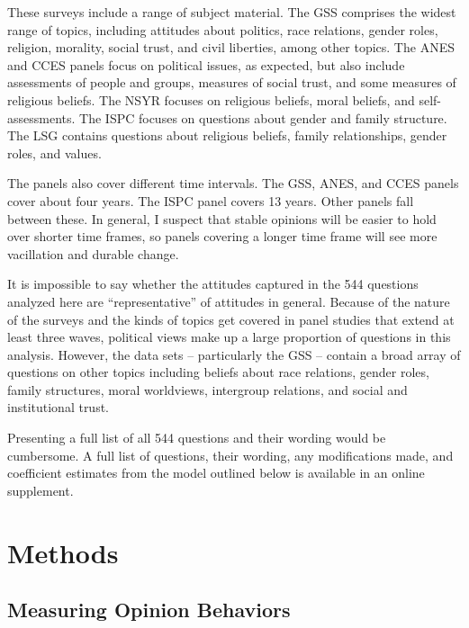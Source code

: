 \documentclass[12pt,]{article}
\begin{document}
These surveys include a range of subject material. The GSS comprises the widest range of topics, including attitudes about politics, race relations, gender roles, religion, morality, social trust, and civil liberties, among other topics. The ANES and CCES panels focus on political issues, as expected, but also include assessments of people and groups, measures of social trust, and some measures of religious beliefs. The NSYR focuses on religious beliefs, moral beliefs, and self-assessments. The ISPC focuses on questions about gender and family structure. The LSG contains questions about religious beliefs, family relationships, gender roles, and values.

The panels also cover different time intervals. The GSS, ANES, and CCES panels cover about four years. The ISPC panel covers 13 years. Other panels fall between these. In general, I suspect that stable opinions will be easier to hold over shorter time frames, so panels covering a longer time frame will see more vacillation and durable change.

It is impossible to say whether the attitudes captured in the 544 questions analyzed here are ``representative'' of attitudes in general. Because of the nature of the surveys and the kinds of topics get covered in panel studies that extend at least three waves, political views make up a large proportion of questions in this analysis. However, the data sets -- particularly the GSS -- contain a broad array of questions on other topics including beliefs about race relations, gender roles, family structures, moral worldviews, intergroup relations, and social and institutional trust.

Presenting a full list of all 544 questions and their wording would be cumbersome. A full list of questions, their wording, any modifications made, and coefficient estimates from the model outlined below is available in an online supplement.

\hypertarget{methods}{%
\section{Methods}\label{methods}}

\hypertarget{measuring-opinion-behaviors}{%
\subsection{Measuring Opinion Behaviors}\label{measuring-opinion-behaviors}}
\end{document}
